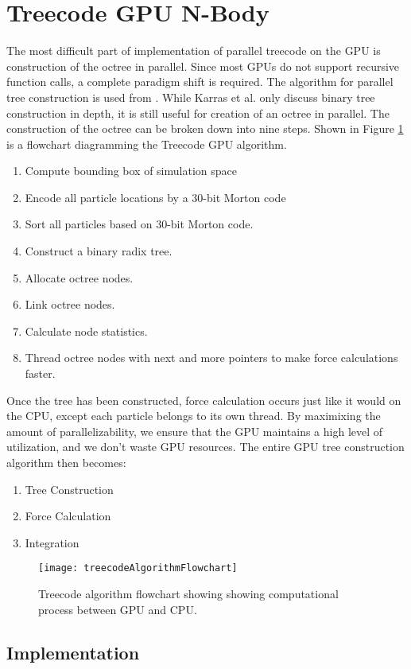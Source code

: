 \documentclass{thesis}
\begin{document}
\section{Treecode GPU N-Body}
The most difficult part of implementation of parallel treecode on the GPU is construction of the octree in parallel. Since most GPUs do not support recursive function calls, a complete paradigm shift is required. The algorithm for parallel tree construction is used from \cite{karras:2012}. While Karras et al. only discuss binary tree construction in depth, it is still useful for creation of an octree in parallel. The construction of the octree can be broken down into nine steps. Shown in Figure \ref{fig:GPUTreecodeAlg} is a flowchart diagramming the Treecode GPU algorithm.
\begin{enumerate}
    \item Compute bounding box of simulation space
    \item Encode all particle locations by a 30-bit Morton code
    \item Sort all particles based on 30-bit Morton code.
    \item Construct a binary radix tree.
    \item Allocate octree nodes.
    \item Link octree nodes.
    \item Calculate node statistics.
    \item Thread octree nodes with next and more pointers to make force calculations faster.
\end{enumerate}
Once the tree has been constructed, force calculation occurs just like it would on the CPU, except each particle belongs to its own thread. By maximixing the amount of parallelizability, we ensure that the GPU maintains a high level of utilization, and we don't waste GPU resources. The entire GPU tree construction algorithm then becomes:
\begin{enumerate}
    \item Tree Construction
    \item Force Calculation
    \item Integration
\end{enumerate}
\begin{figure}[h]
    \caption{Treecode algorithm flowchart showing showing computational process between GPU and CPU.}
    \label{fig:GPUTreecodeAlg}
    \centering
    \texttt{[image: treecodeAlgorithmFlowchart]}
\end{figure}
\subsection{Implementation}
\end{document}
